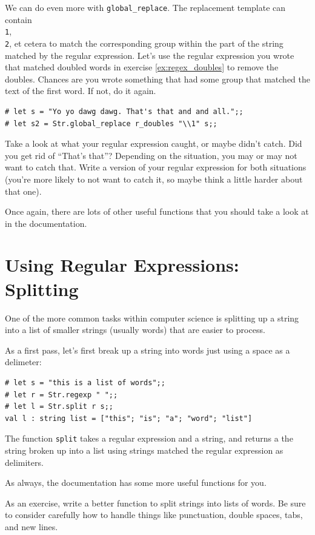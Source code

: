 \documentclass[10pt]{book}
\begin{document}
{We can do even more with {\tt global\_replace}. The replacement template can contain {\tt \\1}, {\tt \\2}, et cetera to match the corresponding group within the part of the string matched by the regular expression. Let's use the regular expression you wrote that matched doubled words in exercise \ref{ex:regex_doubles} to remove the doubles. Chances are you wrote something that had some group that matched the text of the first word. If not, do it again.

\beforeverb
\begin{verbatim}
# let s = "Yo yo dawg dawg. That's that and and all.";;
# let s2 = Str.global_replace r_doubles "\\1" s;;
\end{verbatim}
\afterverb
Take a look at what your regular expression caught, or maybe didn't catch. Did you get rid of ``That's that''? Depending on the situation, you may or may not want to catch that. Write a version of your regular expression for both situations (you're more likely to not want to catch it, so maybe think a little harder about that one).

Once again, there are lots of other useful functions that you should take a look at in the documentation.

\section{Using Regular Expressions: Splitting}

One of the more common tasks within computer science is splitting up a string into a list of smaller strings (usually words) that are easier to process.

As a first pass, let's first break up a string into words just using a space as a delimeter:
\beforeverb
\begin{verbatim}
# let s = "this is a list of words";;
# let r = Str.regexp " ";;
# let l = Str.split r s;;
val l : string list = ["this"; "is"; "a"; "word"; "list"]
\end{verbatim}
\afterverb
The function {\tt split} takes a regular expression and a string, and returns a the string broken up into a list using strings matched the regular expression as delimiters.

As always, the documentation has some more useful functions for you.

\begin{ex}
As an exercise, write a better function to split strings into lists of words. Be sure to consider carefully how to handle things like punctuation, double spaces, tabs, and new lines.
\end{ex}

}
\end{document}
